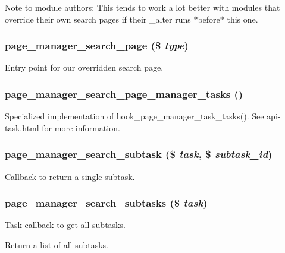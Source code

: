 Note to module authors: This tends to work a lot better with modules that override their own search pages if their \_\-alter runs $\ast$before$\ast$ this one. \hypertarget{search_8inc_a8ca5b1c88c351db56b4b672edf8f6dc3}{
\subsubsection[{page\_\-manager\_\-search\_\-page}]{\setlength{\rightskip}{0pt plus 5cm}page\_\-manager\_\-search\_\-page (\$ {\em type})}}
\label{search_8inc_a8ca5b1c88c351db56b4b672edf8f6dc3}
Entry point for our overridden search page. \hypertarget{search_8inc_ab3a19319349c19ffc47a5c86576efeee}{
\subsubsection[{page\_\-manager\_\-search\_\-page\_\-manager\_\-tasks}]{\setlength{\rightskip}{0pt plus 5cm}page\_\-manager\_\-search\_\-page\_\-manager\_\-tasks ()}}
\label{search_8inc_ab3a19319349c19ffc47a5c86576efeee}
Specialized implementation of hook\_\-page\_\-manager\_\-task\_\-tasks(). See api-\/task.html for more information. \hypertarget{search_8inc_a38327af8827244b7c5f213421903c51e}{
\subsubsection[{page\_\-manager\_\-search\_\-subtask}]{\setlength{\rightskip}{0pt plus 5cm}page\_\-manager\_\-search\_\-subtask (\$ {\em task}, \/  \$ {\em subtask\_\-id})}}
\label{search_8inc_a38327af8827244b7c5f213421903c51e}
Callback to return a single subtask. \hypertarget{search_8inc_ac7befb521ac263f9bc2dbe8b9019d615}{
\subsubsection[{page\_\-manager\_\-search\_\-subtasks}]{\setlength{\rightskip}{0pt plus 5cm}page\_\-manager\_\-search\_\-subtasks (\$ {\em task})}}
\label{search_8inc_ac7befb521ac263f9bc2dbe8b9019d615}
Task callback to get all subtasks.

Return a list of all subtasks. 
